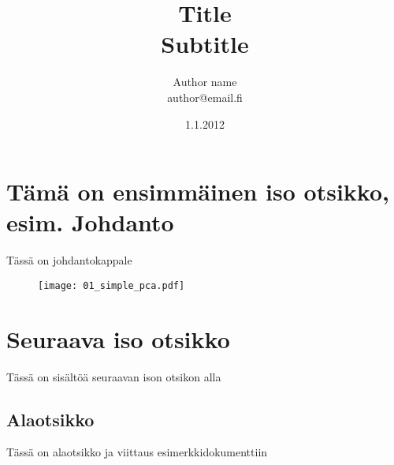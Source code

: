 \documentclass[a4paper]{article}
\begin{document}
\title{\huge Title \\ \large Subtitle}
\date{1.1.2012}
\author{Author name \\ author@email.fi}
\maketitle

\large

\section{Tämä on ensimmäinen iso otsikko, esim. Johdanto}

Tässä on johdantokappale

\begin{figure}[htb]
    \centering
    \texttt{[image: 01\_simple\_pca.pdf]}
\end{figure}

\section{Seuraava iso otsikko}

Tässä on sisältöä seuraavan ison otsikon alla

\subsection{Alaotsikko}

Tässä on alaotsikko ja viittaus esimerkkidokumenttiin \citep{koski2012}




\end{document}

